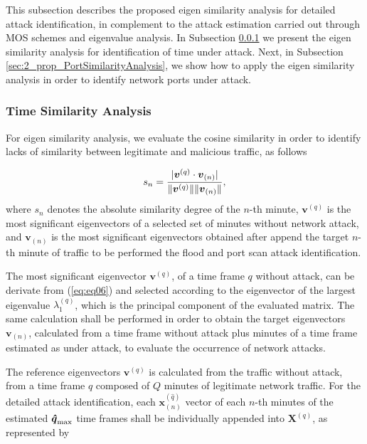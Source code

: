 This subsection describes the proposed eigen similarity analysis for detailed attack identification, in complement to the attack estimation carried out through MOS schemes and eigenvalue analysis. In Subsection \ref{sec:2_prop_TimeSimilarityAnalysis} we present the eigen similarity analysis for identification of time under attack. Next, in Subsection \ref{sec:2_prop_PortSimilarityAnalysis}, we show how to apply the eigen similarity analysis in order to identify network ports under attack.

\subsubsection{Time Similarity Analysis}
\label{sec:2_prop_TimeSimilarityAnalysis}

For eigen similarity analysis, we evaluate the cosine similarity in order to identify lacks of similarity between legitimate and malicious traffic, as follows

\begin{equation}\label{eq:eq11}
s_n = \frac{\lvert\boldsymbol{v}^{(q)} \cdot \boldsymbol{v}_{(n)}\rvert}{\lVert\boldsymbol{v}^{(q)}\rVert\lVert\boldsymbol{v}_{(n)}\rVert},
\end{equation}
where $s_n$ denotes the absolute similarity degree of the $n$-th minute, $\boldsymbol{v}^{(q)}$ is the most significant eigenvectors of a selected set of minutes without network attack, and $\boldsymbol{v}_{(n)}$ is the most significant eigenvectors obtained after append the target $n$-th minute of traffic to be performed the flood and port scan attack identification.

The most significant eigenvector $\boldsymbol{v}^{(q)}$, of a time frame $q$ without attack, can be derivate from (\ref{eq:eq06}) and selected according to the eigenvector of the largest eigenvalue $\lambda_1^{(q)}$, which is the principal component of the evaluated matrix. The same calculation shall be performed in order to obtain the target eigenvectors $\boldsymbol{v}_{(n)}$, calculated from a time frame without attack plus minutes of a time frame estimated as under attack, to evaluate the occurrence of network attacks. 

The reference eigenvectors $\boldsymbol{v}^{(q)}$ is calculated from the traffic without attack, from a time frame $q$ composed of $Q$ minutes of legitimate network traffic. For the detailed attack identification, each $\boldsymbol{x}^{(\hat{q})}_{(n)}$ vector of each $n$-th minutes of the estimated $\rm{\boldsymbol{\hat{q}}}_{\rm max}$ time frames shall be individually appended into $\boldsymbol{X}^{(q)}$, as represented by

